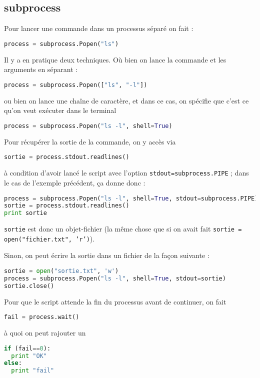 \documentclass[a4paper,twoside]{article}
\begin{document}
\subsection{subprocess}\label{sec:subprocess}
Pour lancer une commande dans un processus séparé on fait :
\begin{lstlisting}[language=python]
process = subprocess.Popen("ls")
\end{lstlisting}

Il y a en pratique deux techniques. Où bien on lance la commande et les arguments en séparant :
\begin{lstlisting}[language=python]
process = subprocess.Popen(["ls", "-l"])
\end{lstlisting}
ou bien on lance une chaîne de caractère, et dans ce cas, on spécifie que c'est ce qu'on veut exécuter dans le terminal
\begin{lstlisting}[language=python]
process = subprocess.Popen("ls -l", shell=True)
\end{lstlisting}

\bigskip

Pour récupérer la sortie de la commande, on y accès via
\begin{lstlisting}[language=python]
sortie = process.stdout.readlines()
\end{lstlisting}
à condition d'avoir lancé le script avec l'option \verb|stdout=subprocess.PIPE| ; dans le cas de l'exemple précédent, ça donne donc :
\begin{lstlisting}[language=python]
process = subprocess.Popen("ls -l", shell=True, stdout=subprocess.PIPE)
sortie = process.stdout.readlines()
print sortie
\end{lstlisting}

\begin{remarque}
\verb|sortie| est donc un objet-fichier (la même chose que si on avait fait \texttt{sortie = open("fichier.txt", 'r')}).
\end{remarque}


Sinon, on peut écrire la sortie dans un fichier de la façon suivante :
\begin{lstlisting}[language=python]
sortie = open("sortie.txt", 'w')
process = subprocess.Popen("ls -l", shell=True, stdout=sortie)
sortie.close()
\end{lstlisting}

Pour que le script attende la fin du processus avant de continuer, on fait
\begin{lstlisting}[language=python]
fail = process.wait()
\end{lstlisting}
à quoi on peut rajouter un
\begin{lstlisting}[language=python]
if (fail==0):
  print "OK"
else:
  print "fail"
\end{lstlisting}
\end{document}
